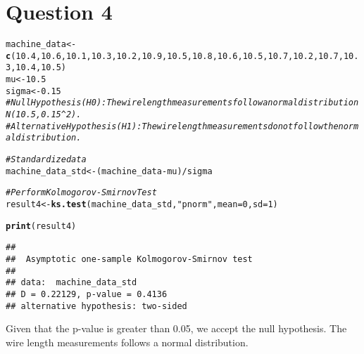 \documentclass{article}\usepackage[]{graphicx}\usepackage[]{xcolor}
\makeatletter
\newcommand{\hlnum}[1]{\textcolor[rgb]{0.686,0.059,0.569}{#1}}%
\newcommand{\hlsng}[1]{\textcolor[rgb]{0.192,0.494,0.8}{#1}}%
\newcommand{\hlcom}[1]{\textcolor[rgb]{0.678,0.584,0.686}{\textit{#1}}}%
\newcommand{\hlopt}[1]{\textcolor[rgb]{0,0,0}{#1}}%
\newcommand{\hldef}[1]{\textcolor[rgb]{0.345,0.345,0.345}{#1}}%
\newcommand{\hlkwb}[1]{\textcolor[rgb]{0.69,0.353,0.396}{#1}}%
\newcommand{\hlkwc}[1]{\textcolor[rgb]{0.333,0.667,0.333}{#1}}%
\newcommand{\hlkwd}[1]{\textcolor[rgb]{0.737,0.353,0.396}{\textbf{#1}}}%
\newenvironment{kframe}{%
 \def\at@end@of@kframe{}%
 \ifinner\ifhmode%
  \def\at@end@of@kframe{\end{minipage}}%
  \begin{minipage}{\columnwidth}%
 \fi\fi%
 \def\FrameCommand##1{\hskip\@totalleftmargin \hskip-\fboxsep
 \colorbox{shadecolor}{##1}\hskip-\fboxsep
     \hskip-\linewidth \hskip-\@totalleftmargin \hskip\columnwidth}%
 \MakeFramed {\advance\hsize-\width
   \@totalleftmargin\z@ \linewidth\hsize
   \@setminipage}}%
 {\par\unskip\endMakeFramed%
 \at@end@of@kframe}
\newenvironment{knitrout}{}{} %
\makeatother
\begin{document}
\section{Question 4}
\begin{knitrout}
\color{fgcolor}\begin{kframe}
\begin{alltt}
\hldef{machine_data} \hlkwb{<-} \hlkwd{c}\hldef{(}\hlnum{10.4}\hldef{,} \hlnum{10.6}\hldef{,} \hlnum{10.1}\hldef{,} \hlnum{10.3}\hldef{,} \hlnum{10.2}\hldef{,} \hlnum{10.9}\hldef{,} \hlnum{10.5}\hldef{,} \hlnum{10.8}\hldef{,} \hlnum{10.6}\hldef{,} \hlnum{10.5}\hldef{,} \hlnum{10.7}\hldef{,} \hlnum{10.2}\hldef{,} \hlnum{10.7}\hldef{,} \hlnum{10.3}\hldef{,} \hlnum{10.4}\hldef{,} \hlnum{10.5}\hldef{)}
\hldef{mu} \hlkwb{<-} \hlnum{10.5}
\hldef{sigma} \hlkwb{<-} \hlnum{0.15}
\hlcom{# Null Hypothesis (H0): The wire length measurements follow a normal distribution N(10.5, 0.15^2).}
\hlcom{# Alternative Hypothesis (H1): The wire length measurements do not follow the normal distribution.}

\hlcom{# Standardize data}
\hldef{machine_data_std} \hlkwb{<-} \hldef{(machine_data} \hlopt{-} \hldef{mu)} \hlopt{/} \hldef{sigma}

\hlcom{# Perform Kolmogorov-Smirnov Test}
\hldef{result4} \hlkwb{<-} \hlkwd{ks.test}\hldef{(machine_data_std,} \hlsng{"pnorm"}\hldef{,} \hlkwc{mean} \hldef{=} \hlnum{0}\hldef{,} \hlkwc{sd} \hldef{=} \hlnum{1}\hldef{)}
\end{alltt}


{\ttfamily\noindent{}}\begin{alltt}
\hlkwd{print}\hldef{(result4)}
\end{alltt}
\begin{verbatim}
## 
## 	Asymptotic one-sample Kolmogorov-Smirnov test
## 
## data:  machine_data_std
## D = 0.22129, p-value = 0.4136
## alternative hypothesis: two-sided
\end{verbatim}
\end{kframe}
\end{knitrout}
Given that the p-value is greater than 0.05, we accept the null hypothesis. The wire length measurements follows a normal distribution.
\end{document}
